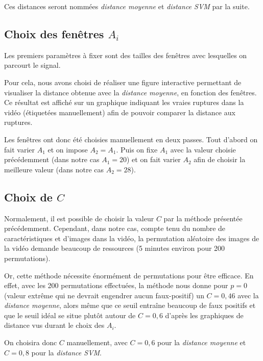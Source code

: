 Ces distances seront nommées \textit{distance moyenne} et \textit{distance SVM} par la suite.

\subsection{Choix des fenêtres $A_i$}

Les premiers paramètres à fixer sont des tailles des fenêtres avec lesquelles on parcourt le signal.

Pour cela, nous avons choisi de réaliser une figure interactive permettant de visualiser la distance obtenue avec la \textit{distance moyenne}, en fonction des fenêtres. Ce résultat est affiché sur un graphique indiquant les vraies ruptures dans la vidéo (étiquetées manuellement) afin de pouvoir comparer la distance aux ruptures.

Les fenêtres ont donc été choisies manuellement en deux passes. Tout d'abord on fait varier $A_1$ et on impose $A_2 = A_1$. Puis on fixe $A_1$ avec la valeur choisie précédemment (dans notre cas $A_1=20$) et on fait varier $A_2$ afin de choisir la meilleure valeur (dans notre cas $A_2=28$).


\subsection{Choix de $C$}

Normalement, il est possible de choisir la valeur $C$ par la méthode présentée précédemment. Cependant, dans notre cas, compte tenu du nombre de caractéristiques et d'images dans la vidéo, la permutation aléatoire des images de la vidéo demande beaucoup de ressources (5 minutes environ pour 200 permutations).

Or, cette méthode nécessite énormément de permutations pour être efficace. En effet, avec les 200 permutations effectuées, la méthode nous donne pour $p=0$ (valeur extrême qui ne devrait engendrer aucun faux-positif) un $C=0,46$ avec la \textit{distance moyenne}, alors même que ce seuil entraîne beaucoup de faux positifs et que le seuil idéal se situe plutôt autour de $C=0,6$ d'après les graphiques de distance vus durant le choix des $A_i$.

On choisira donc $C$ manuellement, avec $C=0,6$ pour la \textit{distance moyenne} et $C=0,8$ pour la \textit{distance SVM}.

